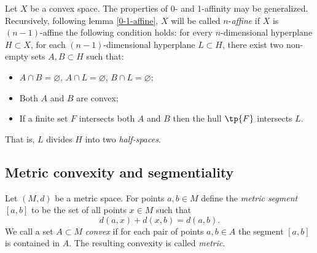 \documentclass[12pt, a4paper]{article}
\begin{document}
\begin{definition}\label{def-n-affine}
    Let \(X\) be a convex space. The properties of 0- and 1-affinity may be generalized. Recursively, following lemma \ref{0-1-affine}, \(X\) will be called \(n\)-\textit{affine} if \(X\) is \((n-1)\)-affine the following condition holds: for every \(n\)-dimensional hyperplane \(H \subset X\), for each \((n-1)\)-dimensional hyperplane \(L \subset H\), there exist two non-empty sets \(A, B \subset H\) such that:

    \begin{itemize}
        \item \(A \cap B = \varnothing\), \(A \cap L = \varnothing\), \(B \cap L = \varnothing\);
        \item Both \(A\) and \(B\) are convex;
        \item If a finite set \(F\) intersects both \(A\) and \(B\) then the hull \(\tp{F}\) intersects \(L\).
    \end{itemize}

    That is, \(L\) divides \(H\) into two \textit{half-spaces}.
\end{definition}

















\subsection{Metric convexity and segmentiality}
\label{mcs}

\begin{definition}\label{def-met-conv}
    Let \((M, d)\) be a metric space. For points \(a, b \in M\) define the \textit{metric segment} \([a, b]\) to be the set of all points \(x \in M\) such that \[d(a, x) + d(x, b) = d(a,b).\] We call a set \(A \subset M\) \textit{convex} if for each pair of points \(a, b \in A\) the segment \([a, b]\) is contained in \(A\). The resulting convexity is called \textit{metric}.
\end{definition}
\end{document}
